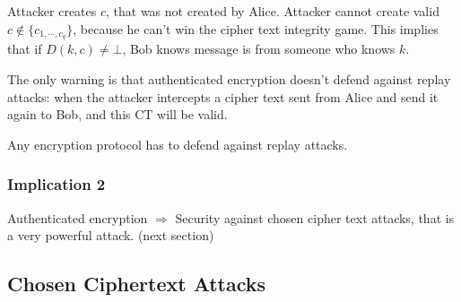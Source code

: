 \documentclass[12pt]{book}
\begin{document}
\begin{center}
\end{center}Attacker creates $c$, that was not created by Alice. Attacker cannot create valid $c\notin\{c_{1,\cdots,c_{q}}\}$, because he can't win the cipher text integrity game. This implies that if $D(k,c)\neq\bot$, Bob knows message is from someone who knows $k$.

The only warning is that authenticated encryption doesn't defend against replay attacks: when the attacker intercepts a cipher text sent from Alice and send it again to Bob, and this CT will be valid.

Any encryption protocol has to defend against replay attacks.

\subsubsection{Implication 2}
Authenticated encryption $\Longrightarrow$ Security against chosen cipher text attacks, that is a very powerful attack. (next section)

\subsection{Chosen Ciphertext Attacks}
\end{document}

